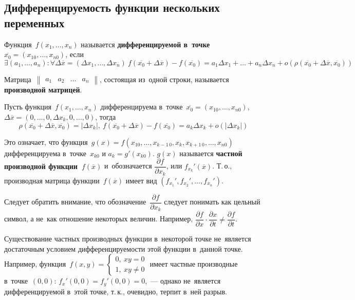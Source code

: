 \subsection{Дифференцируемость функции нескольких переменных}
Функция~$f(x_1, \ldots, x_n)$ называется \textbf{дифференцируемой в~точке~$\overline{x_0} = (x_{10}, \ldots, x_{n0})$}, если
\begin{equation*}
\exists (a_1, \ldots, a_n) \colon \forall \Delta \overline x = (\Delta x_1, \ldots, \Delta x_n) \
f(\overline{x_0} + \Delta \overline x) - f(\overline{x_0}) =
a_1 \Delta x_1 + \ldots + a_n \Delta x_n + o(\rho(\overline{x_0} + \Delta \overline x, \overline{x_0}))
\end{equation*}

Матрица~$\begin{Vmatrix}
a_1 & a_2 & \ldots & a_n
\end{Vmatrix}$, состоящая из~одной строки, называется \textbf{производной матрицей}.

Пусть функция~$f(x_1, \ldots, x_n)$ дифференцируема в~точке~$\overline{x_0} = (x_{10}, \ldots, \allowbreak x_{n0})$, $\Delta \overline x = (0, \ldots, \allowbreak 0, \Delta x_k, \allowbreak 0, \ldots, \allowbreak 0)$, тогда
\begin{equation*}
\rho(\overline{x_0} + \Delta \overline x, \overline{x_0}) = |\Delta x_k|, \
f(\overline{x_0} + \Delta \overline x) - f(\overline{x_0}) =
a_k \Delta x_k + o(|\Delta x_k|)
\end{equation*}

Это означает, что функция~$g(x) = f(x_{10}, \ldots, x_{k-1\, 0}, x_k, x_{k+1\, 0}, \ldots, x_{n0})$ дифференцируема в~точке~$x_{k0}$ и $a_k = g'(x_{k0})$.
 $g(x)$ называется \textbf{частной производной функции~$f(\overline x)$} и~обозначается $\dfrac{\partial f}{\partial x_k}$, или $f_{x_k}'(\overline x)$.
Т.\,о., производная матрица функции~$f(\overline x)$ имеет вид $(f_{x_1}', f_{x_2}', \ldots, f_{x_n}')$.

Следует обратить внимание, что обозначение~$\dfrac{\partial f}{\partial x_k}$ следует понимать как цельный символ, а не~как отношение некоторых величин.
Например, $\dfrac{\partial f}{\partial x} \cdot \dfrac{\partial x}{\partial t} \neq \dfrac{\partial f}{\partial t}$.

Существование частных производных функции в~некоторой точке не~является достаточным условием дифференцируемости этой функции в~данной точке.
Например, функция~$f(x, y) =
\begin{cases}
0, \ xy = 0 \\
1, \ xy \neq 0
\end{cases}$
имеет частные производные в~точке~$(0, 0)$: $f_x'(0, 0) = f_y'(0, 0) = 0$,~--- однако не~является дифференцируемой в~этой точке, т.\,к., очевидно, терпит в~ней разрыв.

